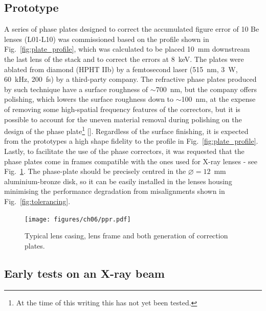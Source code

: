 \begin{refsection}
\clearpage
\section{Prototype}\label{sec:prototype}

A series of phase plates designed to correct the accumulated figure error of 10 Be lenses (L01-L10) was commissioned based on the profile shown in Fig.~\ref{fig:plate_profile}, which was calculated to be placed 10~mm downstream the last lens of the stack and to correct the errors at 8~keV. The plates were ablated from diamond (HPHT IIb) by a femtosecond laser (515~nm, 3~W, 60~kHz, 200~fs) by a third-party company. The refractive phase plates produced by such technique have a surface roughness of $\sim$700~nm, but the company offers polishing, which lowers the surface roughness down to $\sim$100~nm, at the expense of removing some high-spatial frequency features of the correctors, but it is possible to account for the uneven material removal during polishing on the design of the phase plate\footnote{At the time of this writing this has not yet been tested.} [\cite{Antipov2020}]. Regardless of the surface finishing, it is expected from the prototypes a high shape fidelity to the profile in Fig.~\ref{fig:plate_profile}. Lastly, to facilitate the use of the phase correctors, it was requested that the phase plates come in frames compatible with the ones used for X-ray lenses - see Fig.~\ref{fig:potpourri}. The phase-plate should be precisely centred in the $\diameter=12$~mm aluminium-bronze disk, so it can be easily installed in the lenses housing minimising the performance degradation from misalignments shown in Fig.~\ref{fig:tolerancing}.

\begin{figure}[t]
        \centering
        {\texttt{[image: figures/ch06/ppr.pdf]}}
        \caption[Lens casing, frame and correction plates]{Typical lens casing, lens frame and both generation of correction plates. }\label{fig:potpourri}
\end{figure}
\subsection{Early tests on an X-ray beam}\label{sec:prototype_testing}


\end{refsection}
